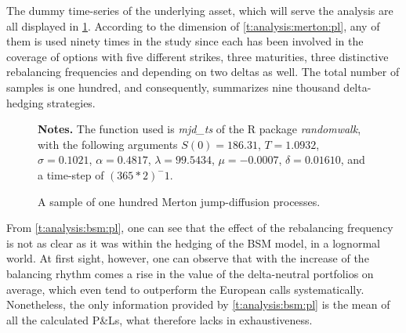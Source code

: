 \documentclass[a4paper, 12pt]{report}
\begin{document}
The dummy time-series of the underlying asset, which will serve the analysis are all displayed in \cref{p:analysis:mjd:100}. 
According to the dimension of \cref{t:analysis:merton:pl}, any of them is used ninety times in the study since each has been involved in the coverage of options with five different strikes, three maturities, three distinctive rebalancing frequencies and depending on two deltas as well.
The total number of samples is one hundred, and consequently,  summarizes nine thousand delta-hedging strategies.

\begin{figure}[h]
  \centering
  
  \caption{A sample of one hundred Merton jump-diffusion processes.}
  \begin{changemargin}{0.5cm}{0.5cm}
  \medskip
\footnotesize
{}\textbf{Notes.} The function used is \textit{mjd\_ts} of the R package \textit{randomwalk}, with the following arguments $S(0) = 186.31$, $T = 1.0932$, $\sigma = 0.1021$, $\alpha = 0.4817$, $\lambda = 99.5434$, $\mu = -0.0007$, $\delta = 0.01610$, and a time-step of $(365 * 2)^-1$.
  \end{changemargin}
  \label{p:analysis:mjd:100}
\end{figure}













From \cref{t:analysis:bsm:pl}, one can see that the effect of the rebalancing frequency is not as clear as it was within the hedging of the BSM model, in a lognormal world.
At first sight, however, one can observe that with the increase of the balancing rhythm comes a rise in the value of the delta-neutral portfolios on average, which even tend to outperform the European calls systematically.
Nonetheless, the only information provided by \cref{t:analysis:bsm:pl} is the mean of all the calculated P\&Ls, what therefore lacks in exhaustiveness.
\end{document}
